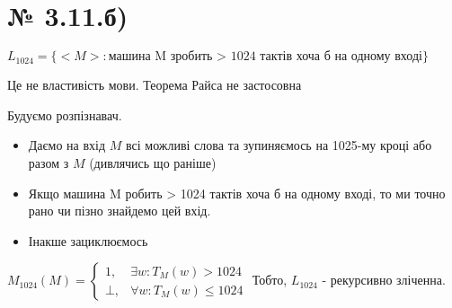 \documentclass[11pt, a4paper]{article} %
\begin{document}
\section*{№ 3.11.б)}
\begin{mdframed}
    $L_{1024} = \{<M> : \text{машина M зробить > 1024 тактів хоча б на одному вході}\}$
\end{mdframed}

Це не властивість мови. Теорема Райса не застосовна

Будуємо розпізнавач.
\begin{itemize}
    \item Даємо на вхід $M$ всі можливі слова та зупиняємось на 1025-му кроці або разом з $M$ (дивлячись що раніше)
    \item Якщо машина M робить > 1024 тактів хоча б на одному вході, то ми точно рано чи пізно знайдемо цей вхід.
    \item Інакше зациклюємось 
\end{itemize}

$M_{1024}(M) = \begin{cases}
    1,& \exists w: T_M(w) > 1024\\
    \bot, & \forall w: T_M(w) \le 1024
\end{cases}$
Тобто, $L_{1024}$ - рекурсивно зліченна.
\end{document}
